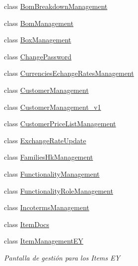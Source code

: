 \begin{DoxyCompactItemize}
\item 
class \mbox{\hyperlink{class_h_k_supply_1_1_forms_1_1_master_1_1_bom_breakdown_management}{Bom\+Breakdown\+Management}}
\item 
class \mbox{\hyperlink{class_h_k_supply_1_1_forms_1_1_master_1_1_bom_management}{Bom\+Management}}
\item 
class \mbox{\hyperlink{class_h_k_supply_1_1_forms_1_1_master_1_1_box_management}{Box\+Management}}
\item 
class \mbox{\hyperlink{class_h_k_supply_1_1_forms_1_1_master_1_1_change_password}{Change\+Password}}
\item 
class \mbox{\hyperlink{class_h_k_supply_1_1_forms_1_1_master_1_1_currencies_echange_rates_management}{Currencies\+Echange\+Rates\+Management}}
\item 
class \mbox{\hyperlink{class_h_k_supply_1_1_forms_1_1_master_1_1_customer_management}{Customer\+Management}}
\item 
class \mbox{\hyperlink{class_h_k_supply_1_1_forms_1_1_master_1_1_customer_management__v1}{Customer\+Management\+\_\+v1}}
\item 
class \mbox{\hyperlink{class_h_k_supply_1_1_forms_1_1_master_1_1_customer_price_list_management}{Customer\+Price\+List\+Management}}
\item 
class \mbox{\hyperlink{class_h_k_supply_1_1_forms_1_1_master_1_1_exchange_rate_update}{Exchange\+Rate\+Update}}
\item 
class \mbox{\hyperlink{class_h_k_supply_1_1_forms_1_1_master_1_1_families_hk_management}{Families\+Hk\+Management}}
\item 
class \mbox{\hyperlink{class_h_k_supply_1_1_forms_1_1_master_1_1_functionality_management}{Functionality\+Management}}
\item 
class \mbox{\hyperlink{class_h_k_supply_1_1_forms_1_1_master_1_1_functionality_role_management}{Functionality\+Role\+Management}}
\item 
class \mbox{\hyperlink{class_h_k_supply_1_1_forms_1_1_master_1_1_incoterms_management}{Incoterms\+Management}}
\item 
class \mbox{\hyperlink{class_h_k_supply_1_1_forms_1_1_master_1_1_item_docs}{Item\+Docs}}
\item 
class \mbox{\hyperlink{class_h_k_supply_1_1_forms_1_1_master_1_1_item_management_e_y}{Item\+Management\+EY}}
\begin{DoxyCompactList}\small\item\em Pantalla de gestión para los Items EY \end{DoxyCompactList}\item 

\end{DoxyCompactItemize}
